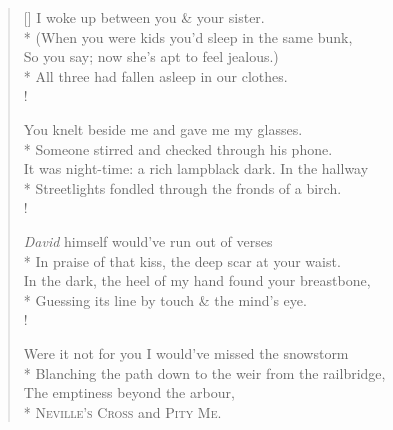 \settowidth{\versewidth}{In the dark, the heel of my hand found your breastbone,}
\begin{verse}[\versewidth]
I woke up between you \& your sister.\\*
\vin (When you were kids you'd sleep in the same bunk,\\
So you say; now she's apt to feel jealous.)\\*
\vin All three had fallen asleep in our clothes.\\!

You knelt beside me and gave me my glasses.\\*
\vin Someone stirred and checked through his phone.\\
It was night-time: a rich lampblack dark. In the hallway\\*
\vin Streetlights fondled through the fronds of a birch.\\!

\emph{David} himself would've run out of verses\\*
\vin In praise of that kiss, the deep scar at your waist.\\
In the dark, the heel of my hand found your breastbone,\\*
\vin Guessing its line by touch \& the mind's eye.\\!

Were it not for you I would've missed the snowstorm\\*
\vin Blanching the path down to the weir from the railbridge,\nobreak\\
The emptiness beyond the arbour,\\*
\vin \textsc{Neville}'\textsc{s Cross} and \textsc{Pity Me}.
\end{verse}
